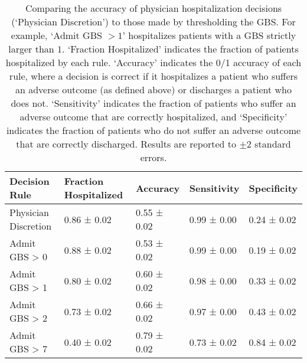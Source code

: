 \begin{table}[!htbp]
\centering
\begin{tabular}{lllll}
  \toprule Decision Rule & Fraction Hospitalized & Accuracy & Sensitivity & Specificity \\ 
  \midrule Physician Discretion & 0.86 ± 0.02 & 0.55 ± 0.02 & 0.99 ± 0.00 & 0.24 ± 0.02 \\ 
  Admit GBS > 0 & 0.88 ± 0.02 & 0.53 ± 0.02 & 0.99 ± 0.00 & 0.19 ± 0.02 \\ 
  Admit GBS > 1 & 0.80 ± 0.02 & 0.60 ± 0.02 & 0.98 ± 0.00 & 0.33 ± 0.02 \\ 
  Admit GBS > 2 & 0.73 ± 0.02 & 0.66 ± 0.02 & 0.97 ± 0.00 & 0.43 ± 0.02 \\ 
  Admit GBS > 7 & 0.40 ± 0.02 & 0.79 ± 0.02 & 0.73 ± 0.02 & 0.84 ± 0.02 \\ 
   \bottomrule \end{tabular}
\caption{
Comparing the accuracy of physician hospitalization decisions (`Physician Discretion') to those made by thresholding the GBS.
For example, `Admit GBS $> 1$' hospitalizes patients with a GBS strictly larger than $1$.  
`Fraction Hospitalized' indicates the fraction of patients hospitalized by each rule.
`Accuracy' indicates the 0/1 accuracy of each rule, where a decision is correct if it hospitalizes a patient who suffers an adverse outcome (as defined above) or discharges a patient who does not.
`Sensitivity' indicates the fraction of patients who suffer an adverse outcome that are correctly hospitalized,
and `Specificity' indicates the fraction of patients who do not suffer an adverse outcome that are correctly discharged.
Results are reported to $\pm 2$ standard errors. 
} 
\label{tab:physician and gbs perf}
\end{table}
